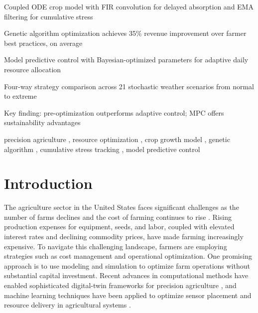 \documentclass[preprint,12pt]{elsarticle}
\begin{document}
\begin{frontmatter}
\begin{highlights}
\item Coupled ODE crop model with FIR convolution for delayed absorption and EMA filtering for cumulative stress
\item Genetic algorithm optimization achieves 35\% revenue improvement over farmer best practices, on average
\item Model predictive control with Bayesian-optimized parameters for adaptive daily resource allocation
\item Four-way strategy comparison across 21 stochastic weather scenarios from normal to extreme
\item Key finding: pre-optimization outperforms adaptive control; MPC offers sustainability advantages
\end{highlights}

\begin{keyword}
precision agriculture \sep
resource optimization \sep
crop growth model \sep
genetic algorithm \sep
cumulative stress tracking \sep
model predictive control
\end{keyword}

\end{frontmatter}

\section{Introduction}\label{sec:intro}

The agriculture sector in the United States faces significant challenges as the number of farms declines and the cost of farming continues to rise \cite{usda-farm-income}. Rising production expenses for equipment, seeds, and labor, coupled with elevated interest rates and declining commodity prices, have made farming increasingly expensive. To navigate this challenging landscape, farmers are employing strategies such as cost management and operational optimization. One promising approach is to use modeling and simulation to optimize farm operations without substantial capital investment. Recent advances in computational methods have enabled sophisticated digital-twin frameworks for precision agriculture \cite{zohdi2024digitaltwin,mengi2023indoorfarming}, and machine learning techniques have been applied to optimize sensor placement and resource delivery in agricultural systems \cite{goodrich2022sensors,tagkopoulos2024aifs}.
\end{document}
